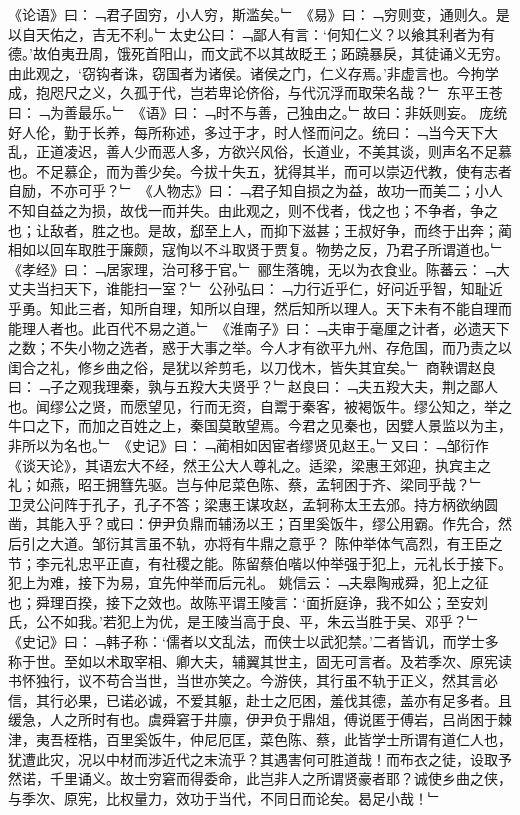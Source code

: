 《论语》曰：﹁君子固穷，小人穷，斯滥矣。﹂
《易》曰：﹁穷则变，通则久。是以自天佑之，吉无不利。﹂太史公曰：﹁鄙人有言：‘何知仁义？以飨其利者为有德。’故伯夷丑周，饿死首阳山，而文武不以其故眨王；跖蹺暴戾，其徒诵义无穷。由此观之，‘窃钩者诛，窃国者为诸侯。诸侯之门，仁义存焉。’非虚言也。今拘学成，抱咫尺之义，久孤于代，岂若卑论侪俗，与代沉浮而取荣名哉？﹂
东平王苍曰：﹁为善最乐。﹂
《语》曰：﹁时不与善，己独由之。﹂故曰：非妖则妄。
庞统好人伦，勤于长养，每所称述，多过于才，时人怪而问之。统曰：﹁当今天下大乱，正道凌迟，善人少而恶人多，方欲兴风俗，长道业，不美其谈，则声名不足慕也。不足慕企，而为善少矣。今拔十失五，犹得其半，而可以崇迈代教，使有志者自励，不亦可乎？﹂
《人物志》曰：﹁君子知自损之为益，故功一而美二；小人不知自益之为损，故伐一而并失。由此观之，则不伐者，伐之也；不争者，争之也；让敌者，胜之也。是故，郄至上人，而抑下滋甚；王叔好争，而终于出奔；蔺相如以回车取胜于廉颇，寇恂以不斗取贤于贾复。物势之反，乃君子所谓道也。﹂
《孝经》曰：﹁居家理，治可移于官。﹂
郦生落魄，无以为衣食业。陈蕃云：﹁大丈夫当扫天下，谁能扫一室？﹂
公孙弘曰：﹁力行近乎仁，好问近乎智，知耻近乎勇。知此三者，知所自理，知所以自理，然后知所以理人。天下未有不能自理而能理人者也。此百代不易之道。﹂
《淮南子》曰：﹁夫审于毫厘之计者，必遗天下之数；不失小物之选者，惑于大事之举。今人才有欲平九州、存危国，而乃责之以闺合之礼，修乡曲之俗，是犹以斧剪毛，以刀伐木，皆失其宜矣。﹂
商鞅谓赵良曰：﹁子之观我理秦，孰与五羖大夫贤乎？﹂赵良曰：﹁夫五羖大夫，荆之鄙人也。闻缪公之贤，而愿望见，行而无资，自鬻于秦客，被褐饭牛。缪公知之，举之牛口之下，而加之百姓之上，秦国莫敢望焉。今君之见秦也，因嬖人景监以为主，非所以为名也。﹂
《史记》曰：﹁蔺相如因宦者缪贤见赵王。﹂又曰：﹁邹衍作《谈天论》，其语宏大不经，然王公大人尊礼之。适梁，梁惠王郊迎，执宾主之礼；如燕，昭王拥篲先驱。岂与仲尼菜色陈、蔡，孟轲困于齐、梁同乎哉？﹂\\
卫灵公问阵于孔子，孔子不答；梁惠王谋攻赵，孟轲称太王去邠。持方柄欲纳圆凿，其能入乎？或曰：伊尹负鼎而辅汤以王；百里奚饭牛，缪公用霸。作先合，然后引之大道。邹衍其言虽不轨，亦将有牛鼎之意乎？
陈仲举体气高烈，有王臣之节；李元礼忠平正直，有社稷之能。陈留蔡伯喈以仲举强于犯上，元礼长于接下。犯上为难，接下为易，宜先仲举而后元礼。
姚信云：﹁夫皋陶戒舜，犯上之征也；舜理百揆，接下之效也。故陈平谓王陵言：‘面折庭诤，我不如公；至安刘氏，公不如我。’若犯上为优，是王陵当高于良、平，朱云当胜于吴、邓乎？﹂
《史记》曰：﹁韩子称：‘儒者以文乱法，而侠士以武犯禁。’二者皆讥，而学士多称于世。至如以术取宰相、卿大夫，辅翼其世主，固无可言者。及若季次、原宪读书怀独行，议不苟合当世，当世亦笑之。今游侠，其行虽不轨于正义，然其言必信，其行必果，已诺必诚，不爱其躯，赴士之厄困，羞伐其德，盖亦有足多者。且缓急，人之所时有也。虞舜窘于井廪，伊尹负于鼎俎，傅说匿于傅岩，吕尚困于棘津，夷吾桎梏，百里奚饭牛，仲尼厄匡，菜色陈、蔡，此皆学士所谓有道仁人也，犹遭此灾，况以中材而涉近代之末流乎？其遇害何可胜道哉！而布衣之徒，设取予然诺，千里诵义。故士穷窘而得委命，此岂非人之所谓贤豪者耶？诚使乡曲之侠，与季次、原宪，比权量力，效功于当代，不同日而论矣。曷足小哉！﹂
